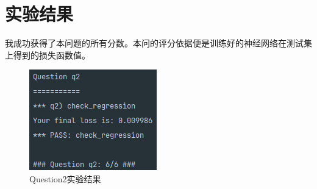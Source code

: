 %
\section{实验结果}
我成功获得了本问题的所有分数。本问的评分依据便是训练好的神经网络在测试集上得到的损失函数值。
\begin{figure}[htbp]
    \centering
    \includegraphics{pic/q2.png}
    \caption{Question2实验结果}\label{q2}
\end{figure}
%
%
